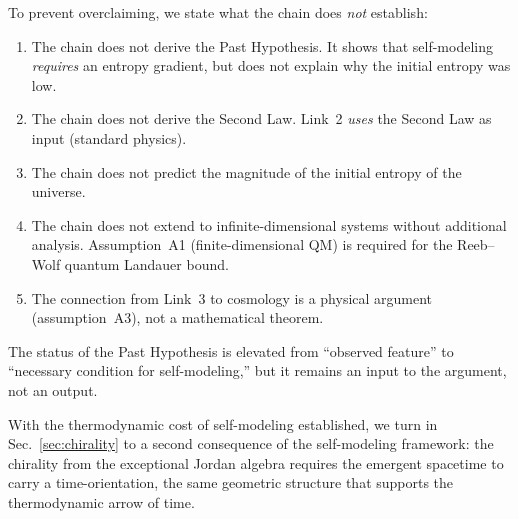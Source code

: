 To prevent overclaiming, we state what the chain does \emph{not}
establish:
\begin{enumerate}
  \item The chain does not derive the Past Hypothesis.  It shows
    that self-modeling \emph{requires} an entropy gradient, but does
    not explain why the initial entropy was low.
  \item The chain does not derive the Second Law.  Link~2 \emph{uses}
    the Second Law as input (standard physics).
  \item The chain does not predict the magnitude of the initial
    entropy of the universe.
  \item The chain does not extend to infinite-dimensional systems
    without additional analysis.  Assumption~A1 (finite-dimensional
    QM) is required for the Reeb--Wolf quantum Landauer bound.
  \item The connection from Link~3 to cosmology is a physical
    argument (assumption~A3), not a mathematical theorem.
\end{enumerate}
The status of the Past Hypothesis is elevated from ``observed
feature'' to ``necessary condition for self-modeling,'' but it
remains an input to the argument, not an output.

\medskip
With the thermodynamic cost of self-modeling established, we turn
in Sec.~\ref{sec:chirality} to a second consequence of the
self-modeling framework: the chirality from the exceptional Jordan
algebra requires the emergent spacetime to carry a time-orientation,
the same geometric structure that supports the thermodynamic arrow
of time.
